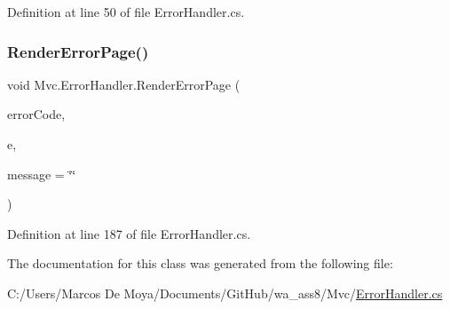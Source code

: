 Definition at line 50 of file Error\+Handler.\+cs.

\mbox{\label{class_mvc_1_1_error_handler_aa560b2667b0451abc9efcedb43691312}} 
\subsubsection{\texorpdfstring{Render\+Error\+Page()}{RenderErrorPage()}\hspace{0.1cm}{\footnotesize\ttfamily [2/2]}}
{\footnotesize\ttfamily void Mvc.\+Error\+Handler.\+Render\+Error\+Page (\begin{DoxyParamCaption}\item[{int}]{error\+Code,  }\item[{\hyperlink{class_p_http_1_1_http_context}{Http\+Context}}]{e,  }\item[{string}]{message = {\ttfamily \char`\"{}\char`\"{}} }\end{DoxyParamCaption})}



Definition at line 187 of file Error\+Handler.\+cs.



The documentation for this class was generated from the following file\+:\begin{DoxyCompactItemize}
\item 
C\+:/\+Users/\+Marcos De Moya/\+Documents/\+Git\+Hub/wa\+\_\+ass8/\+Mvc/\hyperlink{_mvc_2_error_handler_8cs}{Error\+Handler.\+cs}\end{DoxyCompactItemize}
